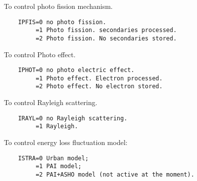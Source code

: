 \ENDCMD


\BEGARG
{}
\ENDARG
{}
\ENDOPT

   \par
To control photo fission mechanism.  
\begin{verbatim}
    IPFIS=0 no photo fission.
         =1 Photo fission. secondaries processed.
         =2 Photo fission. No secondaries stored.
\end{verbatim}

\ENDCMD


\BEGARG
{}
\ENDARG
{}
\ENDOPT

   \par
To control Photo effect.  
\begin{verbatim}
    IPHOT=0 no photo electric effect.
         =1 Photo effect. Electron processed.
         =2 Photo effect. No electron stored.
\end{verbatim}

\ENDCMD


\BEGARG
{}
\ENDARG
{}
\ENDOPT

   \par
To control Rayleigh scattering.  
\begin{verbatim}
    IRAYL=0 no Rayleigh scattering.
         =1 Rayleigh.
\end{verbatim}

\ENDCMD


\BEGARG
{}
\ENDARG
{}
\ENDOPT

   \par
To control energy loss fluctuation model:  
\begin{verbatim}
    ISTRA=0 Urban model;
         =1 PAI model;
         =2 PAI+ASHO model (not active at the moment).
\end{verbatim}

\ENDCMD


